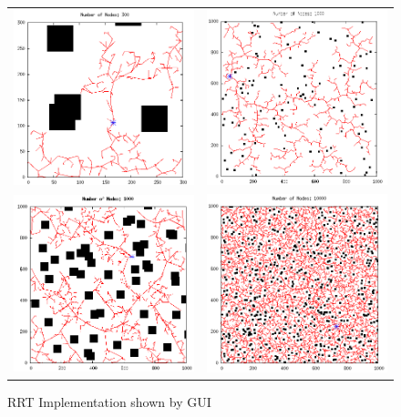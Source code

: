 \begin{figure}[H]
\begin{center}
\begin{tabular}{c  c}
\includegraphics[width=0.5\linewidth]{../master/rrt/img/sampleRRT1.png} & \includegraphics[width=0.5\linewidth]{../master/rrt/img/sampleRRT2.png} \\
\includegraphics[width=0.5\linewidth]{../master/rrt/img/sampleRRT3.png} & \includegraphics[width=0.5\linewidth]{../master/rrt/img/sampleRRT4.png}
\end{tabular}
\caption{RRT Implementation shown by \ac{GUI}}
\label{table:rrtGui}
\end{center}
\end{figure}

